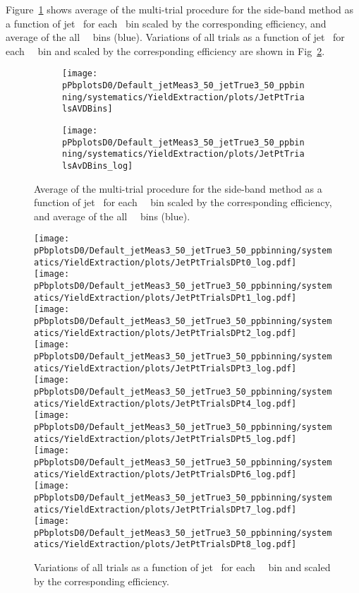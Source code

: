 Figure~\ref{fig:MultiTrialSB_trials_pPB_Dzero} shows average of the multi-trial procedure for the side-band method as a function of jet \pt\ for each \Dzero \pt\ bin scaled by the corresponding efficiency, and average of the all \Dzero\ \pt\ bins (blue). 
Variations of all trials as a function of jet \pt\ for each \Dzero\ \pt\ bin and scaled by the corresponding efficiency are shown in Fig~\ref{fig:MultiTrialSB_allDptVairations_pPB_Dzero}.

\begin{figure}[bth]
\begin{center}
\begin{subfigure}[b]{.48\textwidth}
\texttt{[image: pPbplotsD0/Default\_jetMeas3\_50\_jetTrue3\_50\_ppbinning/systematics/YieldExtraction/plots/JetPtTrialsAVDBins]}
\end{subfigure}
\begin{subfigure}[b]{.48\textwidth}
\texttt{[image: pPbplotsD0/Default\_jetMeas3\_50\_jetTrue3\_50\_ppbinning/systematics/YieldExtraction/plots/JetPtTrialsAvDBins\_log]}
\end{subfigure}
\caption{Average of the multi-trial procedure for the side-band method as a function of jet \pt\ for each \Dzero\ \pt\ bin scaled by the corresponding efficiency, and average of the all \Dzero\ \pt\ bins (blue).} 
\label{fig:MultiTrialSB_trials_pPB_Dzero}
\end{center}
\end{figure}

\begin{figure}[bth]
\begin{center}
\texttt{[image: pPbplotsD0/Default\_jetMeas3\_50\_jetTrue3\_50\_ppbinning/systematics/YieldExtraction/plots/JetPtTrialsDPt0\_log.pdf]}
\texttt{[image: pPbplotsD0/Default\_jetMeas3\_50\_jetTrue3\_50\_ppbinning/systematics/YieldExtraction/plots/JetPtTrialsDPt1\_log.pdf]}
\texttt{[image: pPbplotsD0/Default\_jetMeas3\_50\_jetTrue3\_50\_ppbinning/systematics/YieldExtraction/plots/JetPtTrialsDPt2\_log.pdf]}
\texttt{[image: pPbplotsD0/Default\_jetMeas3\_50\_jetTrue3\_50\_ppbinning/systematics/YieldExtraction/plots/JetPtTrialsDPt3\_log.pdf]}
\texttt{[image: pPbplotsD0/Default\_jetMeas3\_50\_jetTrue3\_50\_ppbinning/systematics/YieldExtraction/plots/JetPtTrialsDPt4\_log.pdf]}
\texttt{[image: pPbplotsD0/Default\_jetMeas3\_50\_jetTrue3\_50\_ppbinning/systematics/YieldExtraction/plots/JetPtTrialsDPt5\_log.pdf]}
\texttt{[image: pPbplotsD0/Default\_jetMeas3\_50\_jetTrue3\_50\_ppbinning/systematics/YieldExtraction/plots/JetPtTrialsDPt6\_log.pdf]}
\texttt{[image: pPbplotsD0/Default\_jetMeas3\_50\_jetTrue3\_50\_ppbinning/systematics/YieldExtraction/plots/JetPtTrialsDPt7\_log.pdf]}
\texttt{[image: pPbplotsD0/Default\_jetMeas3\_50\_jetTrue3\_50\_ppbinning/systematics/YieldExtraction/plots/JetPtTrialsDPt8\_log.pdf]}
\caption{Variations of all trials as a function of jet \pt\ for each \Dzero\ \pt\ bin and scaled by the corresponding efficiency.} 
\label{fig:MultiTrialSB_allDptVairations_pPB_Dzero}
\end{center}
\end{figure}

